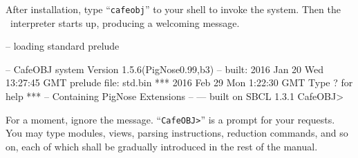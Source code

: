 \documentclass[a4paper]{memoir}
\begin{document}
After installation, type ``\verb|cafeobj|'' to your shell to
invoke the system. Then the \cafeobj~interpreter starts up, producing
a welcoming message.
%
%
%
\begin{vvtm}
\begin{ccode}
-- loading standard prelude

          -- CafeOBJ system Version 1.5.6(PigNose0.99,b3) --
                  built: 2016 Jan 20 Wed 13:27:45 GMT
                         prelude file: std.bin
                                  ***
                      2016 Feb 29 Mon 1:22:30 GMT
                            Type ? for help
                                  ***
                  -- Containing PigNose Extensions --
                                  ---
                             built on SBCL
                                 1.3.1
CafeOBJ>
\end{ccode}
\end{vvtm}
For a moment, ignore the message.
``\verb|CafeOBJ>|'' is a prompt for your requests. You may type
modules, views, parsing instructions, reduction commands, and so on,
each of which shall be gradually introduced in the rest of the manual.
\end{document}
